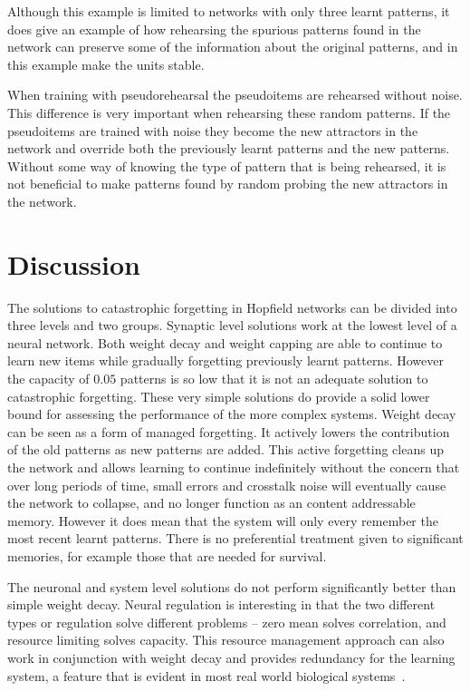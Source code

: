 Although this example is limited to networks with only three learnt patterns, it does give an example of how rehearsing the spurious patterns found in the network can preserve some of the information about the original patterns, and in this example make the units stable. 

When training with pseudorehearsal the pseudoitems are rehearsed without noise.  This difference is very important when rehearsing these random patterns.  If the pseudoitems are trained with noise they become the new attractors in the network and override both the previously learnt patterns and the new patterns.  Without some way of knowing the type of pattern that is being rehearsed, it is not beneficial to make patterns found by random probing the new attractors in the network.

\section{Discussion}

The solutions to catastrophic forgetting in Hopfield networks can be divided into three levels and two groups.  Synaptic level solutions work at the lowest level of a neural network.  Both weight decay and weight capping are able to continue to learn new items while gradually forgetting previously learnt patterns.  However the capacity of $0.05$ patterns is so low that it is not an adequate solution to catastrophic forgetting.  These very simple solutions do provide a solid lower bound for assessing the performance of the more complex systems.  Weight decay can be seen as a form of managed forgetting.  It actively lowers the contribution of the old patterns as new patterns are added.  This active forgetting cleans up the network and allows learning to continue indefinitely without the concern that over long periods of time, small errors and crosstalk noise will eventually cause the network to collapse, and no longer function as an content addressable memory.  However it does mean that the system will only every remember the most recent learnt patterns.  There is no preferential treatment given to significant memories, for example those that are needed for survival.

The neuronal and system level solutions do not perform significantly better than simple weight decay.  Neural regulation is interesting in that the two different types or regulation solve different problems -- zero mean solves correlation, and resource limiting solves capacity.  This resource management approach can also work in conjunction with weight decay and provides redundancy for the learning system, a feature that is evident in most real world biological systems~\citep{Izui1990}.

